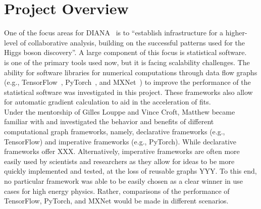 \section{Project Overview}

One of the focus areas for DIANA~\cite{DIANA-proposal-2014} is to ``establish infrastructure for a higher-level of collaborative analysis, building on the successful patterns used for the Higgs boson discovery''.
A large component of this focus is statistical software.
~\cite{Verkerke:2003ir} is one of the primary tools used now, but it is facing scalability challenges.
The ability for software libraries for numerical computations through data flow graphs (e.g., TensorFlow~\cite{tensorflow2015-whitepaper}, PyTorch~\cite{theano-full}, and MXNet~\cite{DBLP:journals/corr/ChenLLLWWXXZZ15}) to improve the performance of the statistical software was investigated in this project.
These frameworks also allow for automatic gradient calculation to aid in the acceleration of fits.\\


Under the mentorship of Gilles Louppe and Vince Croft, Matthew became familiar with and investigated the behavior and benefits of different computational graph frameworks, namely, declarative frameworks (e.g., TensorFlow) and imperative frameworks (e.g., PyTorch).
While declarative frameworks offer XXX.
Alternatively, imperative frameworks are often more easily used by scientists and researchers as they allow for ideas to be more quickly implemented and tested, at the loss of reusable graphs YYY.
To this end, no particular framework was able to be easily chosen as a clear winner in use cases for high energy physics.
Rather, comparisons of the performance of TensorFlow, PyTorch, and MXNet would be made in different scenarios.\\

